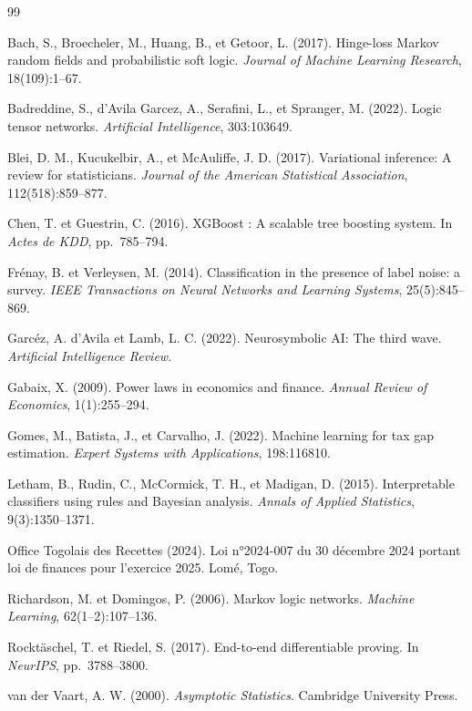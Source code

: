 \documentclass[letterpaper]{article}
\begin{document}

\begin{thebibliography}{99}

Bach, S., Broecheler, M., Huang, B., et Getoor, L. (2017).
Hinge-loss Markov random fields and probabilistic soft logic.
\textit{Journal of Machine Learning Research}, 18(109):1--67.

Badreddine, S., d'Avila Garcez, A., Serafini, L., et Spranger, M. (2022).
Logic tensor networks.
\textit{Artificial Intelligence}, 303:103649.

Blei, D. M., Kucukelbir, A., et McAuliffe, J. D. (2017).
Variational inference: A review for statisticians.
\textit{Journal of the American Statistical Association}, 112(518):859--877.

Chen, T. et Guestrin, C. (2016).
{XGBoost} : A scalable tree boosting system.
In \textit{Actes de KDD}, pp.\ 785--794.

Fr{\'e}nay, B. et Verleysen, M. (2014).
Classification in the presence of label noise: a survey.
\textit{IEEE Transactions on Neural Networks and Learning Systems}, 25(5):845--869.

Garc{\'e}z, A. d'Avila et Lamb, L. C. (2022).
Neurosymbolic AI: The third wave.
\textit{Artificial Intelligence Review}.

Gabaix, X. (2009).
Power laws in economics and finance.
\textit{Annual Review of Economics}, 1(1):255--294.

Gomes, M., Batista, J., et Carvalho, J. (2022).
Machine learning for tax gap estimation.
\textit{Expert Systems with Applications}, 198:116810.

Letham, B., Rudin, C., McCormick, T. H., et Madigan, D. (2015).
Interpretable classifiers using rules and Bayesian analysis.
\textit{Annals of Applied Statistics}, 9(3):1350--1371.

Office Togolais des Recettes (2024).
Loi n°2024-007 du 30 d{\'e}cembre 2024 portant loi de finances
pour l'exercice 2025. Lom{\'e}, Togo.

Richardson, M. et Domingos, P. (2006).
Markov logic networks.
\textit{Machine Learning}, 62(1--2):107--136.

Rockt{\"a}schel, T. et Riedel, S. (2017).
End-to-end differentiable proving.
In \textit{NeurIPS}, pp.\ 3788--3800.

van der Vaart, A. W. (2000).
\textit{Asymptotic Statistics}.
Cambridge University Press.

\end{thebibliography}
\end{document}
